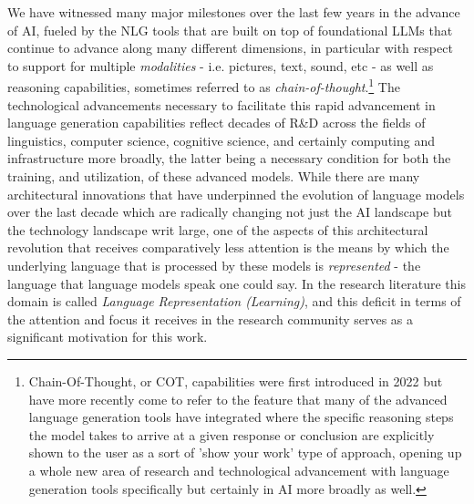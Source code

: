 \documentclass[final]{clv2025}
\begin{document}
We have witnessed many major milestones over the last few years in the advance of AI, fueled by the NLG tools that are built on top of foundational LLMs that continue to advance along many different dimensions, in particular with respect to support for multiple \textit{modalities} - i.e. pictures, text, sound, etc - as well as reasoning capabilities, sometimes referred to as \textit{chain-of-thought}.\footnote{Chain-Of-Thought, or COT, capabilities were first introduced in 2022 \cite{articlewei} but have more recently come to refer to the feature that many of the advanced language generation tools have integrated where the specific reasoning steps the model takes to arrive at a given response or conclusion are explicitly shown to the user as a sort of 'show your work' type of approach, opening up a whole new area of research and technological advancement with language generation tools specifically but certainly in AI more broadly as well.} The technological advancements necessary to facilitate this rapid advancement in language generation capabilities reflect decades of R\&D across the fields of linguistics, computer science, cognitive science, and certainly computing and infrastructure more broadly, the latter being a necessary condition for both the training, and utilization, of these advanced models. While there are many architectural innovations that have underpinned the evolution of language models over the last decade which are radically changing not just the AI landscape but the technology landscape writ large, one of the aspects of this architectural revolution that receives comparatively less attention is the means by which the underlying language that is processed by these models is \textit{represented} - the language that language models speak one could say. In the research literature this domain is called \textit{Language Representation (Learning)}, and this deficit in terms of the attention and focus it receives in the research community serves as a significant motivation for this work. 
\end{document}
